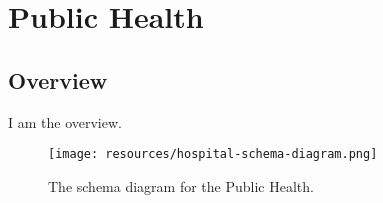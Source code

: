 \section{Public Health}
\label{sec:public-health}
\subsection{Overview}
\label{ssec:overview}

I am the overview.

\begin{figure}[h!]
  \begin{center}
    \texttt{[image: resources/hospital-schema-diagram.png]}
  \end{center}
  \caption{The schema diagram for the Public Health.}
  \label{fig:ov-diagram}
\end{figure}


